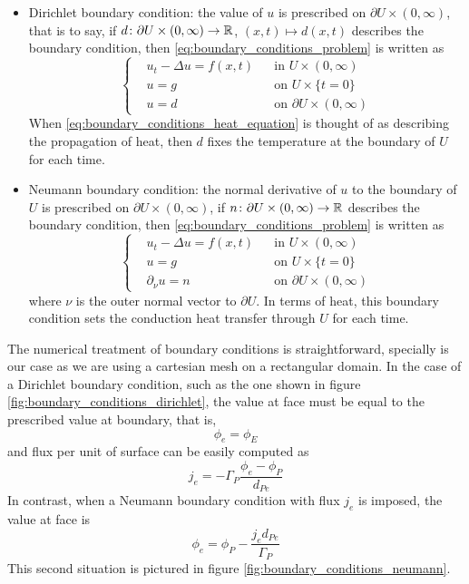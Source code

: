 \begin{itemize}[topsep=0pt]
	\item Dirichlet boundary condition: the value of $u$ is prescribed on
	$\partial U \times (0,\infty)$, that is to say, if $d \colon \partial U
	\times (0,\infty) \rightarrow \mathbb{R}$, $(x, t) \mapsto d(x, t)$
	describes the boundary condition, then
	\eqref{eq:boundary_conditions_problem} is written as
	\begin{equation*}
		\left\{
		\begin{aligned}
			&u_t - \Delta u = f(x, t) & &\text{in } U \times (0,\infty) \\
			&u = g & &\text{on } U \times \{ t = 0 \} \\
			&u = d & &\text{on } \partial U \times (0,\infty)
		\end{aligned}
		\right.
	\end{equation*}
	When \eqref{eq:boundary_conditions_heat_equation} is thought of as
	describing the propagation of heat, then $d$ fixes the temperature at the
	boundary of $U$ for each time.
	\item Neumann boundary condition: the normal derivative of $u$ to the
	boundary of $U$ is prescribed on $\partial U \times (0,\infty)$, \ie if $n
	\colon \partial U \times (0,\infty) \rightarrow \mathbb{R}$ describes the
	boundary condition, then \eqref{eq:boundary_conditions_problem} is written
	as
	\begin{equation*}
		\left\{
		\begin{aligned}
			&u_t - \Delta u = f(x, t) 	& &\text{in } U \times (0,\infty) \\
			&u = g 							& &\text{on } U \times \{ t = 0 \} \\
			&\partial_{\nu} u = n 			& &\text{on } \partial U \times (0,\infty)
		\end{aligned}
		\right.
	\end{equation*}
	where $\nu$ is the outer normal vector to $\partial U$. In terms of heat,
	this boundary condition sets the conduction heat transfer through $U$ for
	each time.
\end{itemize}

The numerical treatment of boundary conditions is straightforward, specially is
our case as we are using a cartesian mesh on a rectangular domain. In the
case of a Dirichlet boundary condition, such as the one shown in figure
\ref{fig:boundary_conditions_dirichlet}, the value at face must be equal to the
prescribed value at boundary, that is,
\begin{equation}
	\phi_e = \phi_E
\end{equation}
and flux per unit of surface can be easily computed as
\begin{equation*}
	j_e = -\Gamma_P \frac{\phi_e - \phi_P}{d_{Pe}}
\end{equation*}
In contrast, when a Neumann boundary condition with flux $j_e$ is imposed, the value at
face is
\begin{equation}
	\phi_e = \phi_P - \frac{j_e d_{Pe}}{\Gamma_P}
\end{equation}
This second situation is pictured in figure
\ref{fig:boundary_conditions_neumann}.


